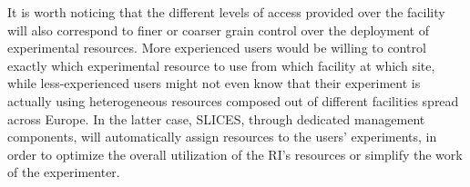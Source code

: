 It is worth noticing that the different levels of access provided over the facility will also correspond to finer or coarser grain control over the deployment of experimental resources. More experienced users would be willing to control exactly which experimental resource to use from which facility at which site, while less-experienced users might not even know that their experiment is actually using heterogeneous resources composed out of different facilities spread across Europe. In the latter case, SLICES, through dedicated management components, will automatically assign resources to the users’ experiments, in order to optimize the overall utilization of the RI’s resources or simplify the work of the experimenter.



